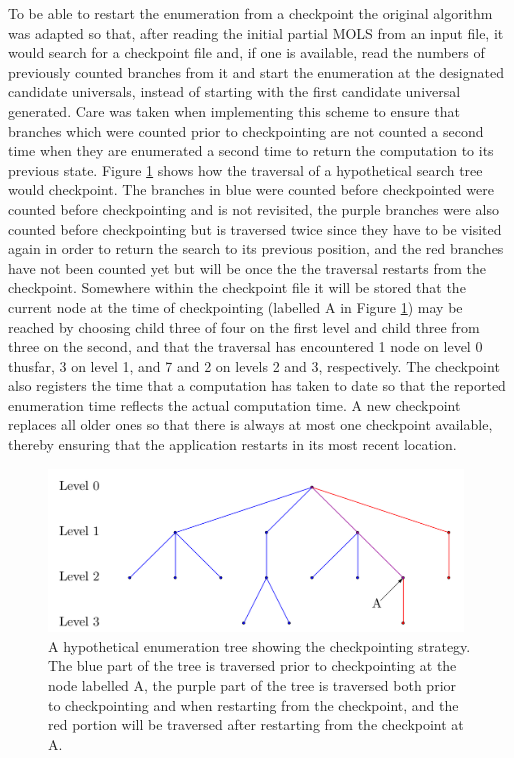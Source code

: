 To be able to restart the enumeration from a checkpoint the original algorithm was adapted so that, after reading the initial partial MOLS from an input file, it would search for a checkpoint file and, if one is available,  read the   numbers of previously counted branches from it and  start the enumeration at the designated candidate universals, instead of starting with the first candidate universal generated. Care was taken when implementing this scheme to ensure that branches which were counted prior to checkpointing are not  counted a second time when they are enumerated a second time to return the computation to its previous state. Figure \ref{fig:checkpoint} shows how the  traversal of a hypothetical search tree would checkpoint. The branches in blue were counted before checkpointed were counted before checkpointing and is not revisited, the purple branches were also counted before checkpointing but is traversed twice since they have to be visited again in order to return the search to its previous position, and the red branches have not been counted yet  but will be once the the traversal restarts from the checkpoint. Somewhere within the checkpoint file it will be stored that the current node  at the time of checkpointing (labelled A in Figure \ref{fig:checkpoint}) may be reached by choosing child three of four on the first level and child three from three on the second, and that the traversal has encountered 1 node  on level 0 thusfar, 3 on level 1, and 7 and 2 on levels 2  and 3, respectively. The checkpoint   also registers the time that a computation has taken to date so that the reported enumeration time   reflects the  actual computation time. A new checkpoint  replaces all older ones so that there is always at most  one checkpoint available, thereby ensuring that the application restarts in its most recent location.
\begin{figure}[htb]
\centering
\includegraphics[width=11cm]{images/checkpointing2}
\caption{A  hypothetical enumeration tree showing the checkpointing strategy. The blue part of the tree is traversed prior to checkpointing at the node labelled A, the purple part of the tree is traversed both prior to checkpointing and when restarting from the checkpoint, and the red portion will be traversed after restarting from the checkpoint at A.} \label{fig:checkpoint}
\end{figure}

